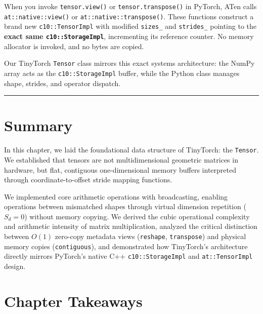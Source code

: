 \documentclass[
  letterpaper,
]{scrbook}
\begin{document}
When you invoke \texttt{tensor.view()} or \texttt{tensor.transpose()} in
PyTorch, ATen calls \texttt{at::native::view()} or
\texttt{at::native::transpose()}. These functions construct a brand new
\texttt{c10::TensorImpl} with modified \texttt{sizes\_} and
\texttt{strides\_} pointing to the \textbf{exact same
\texttt{c10::StorageImpl}}, incrementing its reference counter. No
memory allocator is invoked, and no bytes are copied.

Our TinyTorch \texttt{Tensor} class mirrors this exact systems
architecture: the NumPy array acts as the \texttt{c10::StorageImpl}
buffer, while the Python class manages shape, strides, and operator
dispatch.

\begin{center}\rule{0.5\linewidth}{0.5pt}\end{center}

\section{Summary}\label{summary-1}

In this chapter, we laid the foundational data structure of TinyTorch:
the \texttt{Tensor}. We established that tensors are not
multidimensional geometric matrices in hardware, but flat, contiguous
one-dimensional memory buffers interpreted through coordinate-to-offset
stride mapping functions.

We implemented core arithmetic operations with broadcasting, enabling
operations between mismatched shapes through virtual dimension
repetition (\(S_d = 0\)) without memory copying. We derived the cubic
operational complexity and arithmetic intensity of matrix
multiplication, analyzed the critical distinction between \(O(1)\)
zero-copy metadata views (\texttt{reshape}, \texttt{transpose}) and
physical memory copies (\texttt{contiguous}), and demonstrated how
TinyTorch's architecture directly mirrors PyTorch's native C++
\texttt{c10::StorageImpl} and \texttt{at::TensorImpl} design.

\section{Chapter Takeaways}\label{chapter-takeaways-1}
\end{document}
